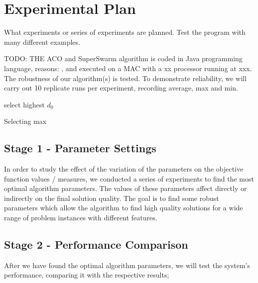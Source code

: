 \section{Experimental Plan}

What experiments or series of experiments are planned. Test the program with many different examples.

TODO: THE ACO and SuperSwarm algorithm is coded in Java programming language, reasons: , and executed on a MAC with a xx processor running at xxx.
The robustness of our algorithm(s) is tested. To demonstrate reliability, we will carry out 10 replicate runs per experiment, recording average, max and min.  


\begin{algorithm}[H]

  {
  		select highest $ d_0 $
  }
 \caption{Selecting max}
\end{algorithm}







\subsection{Stage 1 - Parameter Settings}

In order to study the effect of the variation of the parameters on the objective function values / measures, we conducted a series of experiments to find the most optimal algorithm parameters. The values of these parameters affect directly or indirectly on the final solution quality. The goal is to find some robust parameters which allow the algorithm to find high quality solutions for a wide range of problem instances with different features. 

\subsection{Stage 2 - Performance Comparison}

After we have found the optimal algorithm parameters, we will test the system's performance, comparing it with the respective results;

